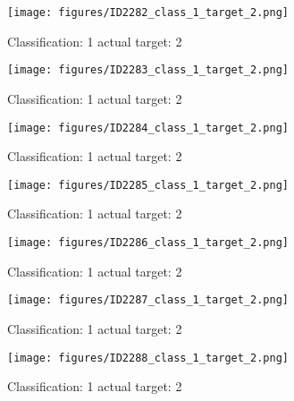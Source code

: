 \begin{figure}[h!]
\begin{center}
\texttt{[image: figures/ID2282\_class\_1\_target\_2.png]}
\end{center}
\caption{ Classification: 1 actual target: 2}
\label{fig:ID2282_class_1_target_2}
\end{figure}
\begin{figure}[h!]
\begin{center}
\texttt{[image: figures/ID2283\_class\_1\_target\_2.png]}
\end{center}
\caption{ Classification: 1 actual target: 2}
\label{fig:ID2283_class_1_target_2}
\end{figure}
\begin{figure}[h!]
\begin{center}
\texttt{[image: figures/ID2284\_class\_1\_target\_2.png]}
\end{center}
\caption{ Classification: 1 actual target: 2}
\label{fig:ID2284_class_1_target_2}
\end{figure}
\begin{figure}[h!]
\begin{center}
\texttt{[image: figures/ID2285\_class\_1\_target\_2.png]}
\end{center}
\caption{ Classification: 1 actual target: 2}
\label{fig:ID2285_class_1_target_2}
\end{figure}
\begin{figure}[h!]
\begin{center}
\texttt{[image: figures/ID2286\_class\_1\_target\_2.png]}
\end{center}
\caption{ Classification: 1 actual target: 2}
\label{fig:ID2286_class_1_target_2}
\end{figure}
\begin{figure}[h!]
\begin{center}
\texttt{[image: figures/ID2287\_class\_1\_target\_2.png]}
\end{center}
\caption{ Classification: 1 actual target: 2}
\label{fig:ID2287_class_1_target_2}
\end{figure}
\begin{figure}[h!]
\begin{center}
\texttt{[image: figures/ID2288\_class\_1\_target\_2.png]}
\end{center}
\caption{ Classification: 1 actual target: 2}
\label{fig:ID2288_class_1_target_2}
\end{figure}
